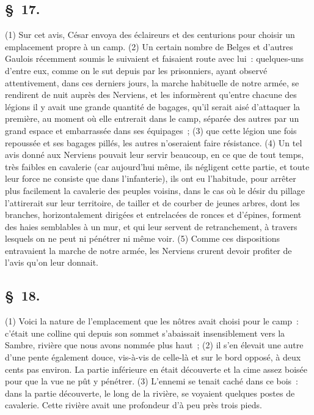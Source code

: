 \documentclass[french,twoside]{book} %
\begin{document}
\subsection[{§ 17.}]{ \textsc{§ 17.} }
\noindent (1) Sur cet avis, César envoya des éclaireurs et des centurions pour choisir un emplacement propre à un camp. (2) Un certain nombre de Belges et d’autres Gaulois récemment soumis le suivaient et faisaient route avec lui : quelques-uns d’entre eux, comme on le sut depuis par les prisonniers, ayant observé attentivement, dans ces derniers jours, la marche habituelle de notre armée, se rendirent de nuit auprès des Nerviens, et les informèrent qu’entre chacune des légions il y avait une grande quantité de bagages, qu’il serait aisé d’attaquer la première, au moment où elle entrerait dans le camp, séparée des autres par un grand espace et embarrassée dans ses équipages ; (3) que cette légion une fois repoussée et ses bagages pillés, les autres n’oseraient faire résistance. (4) Un tel avis donné aux Nerviens pouvait leur servir beaucoup, en ce que de tout temps, très faibles en cavalerie (car aujourd’hui même, ils négligent cette partie, et toute leur force ne consiste que dans l’infanterie), ils ont eu l’habitude, pour arrêter plus facilement la cavalerie des peuples voisins, dans le cas où le désir du pillage l’attirerait sur leur territoire, de tailler et de courber de jeunes arbres, dont les branches, horizontalement dirigées et entrelacées de ronces et d’épines, forment des haies semblables à un mur, et qui leur servent de retranchement, à travers lesquels on ne peut ni pénétrer ni même voir. (5) Comme ces dispositions entravaient la marche de notre armée, les Nerviens crurent devoir profiter de l’avis qu’on leur donnait.
\subsection[{§ 18.}]{ \textsc{§ 18.} }
\noindent (1) Voici la nature de l’emplacement que les nôtres avait choisi pour le camp : c’était une colline qui depuis son sommet s’abaissait insensiblement vers la Sambre, rivière que nous avons nommée plus haut ; (2) il s’en élevait une autre d’une pente également douce, vis-à-vis de celle-là et sur le bord opposé, à deux cents pas environ. La partie inférieure en était découverte et la cime assez boisée pour que la vue ne pût y pénétrer. (3) L'ennemi se tenait caché dans ce bois : dans la partie découverte, le long de la rivière, se voyaient quelques postes de cavalerie. Cette rivière avait une profondeur d’à peu près trois pieds.
\end{document}
